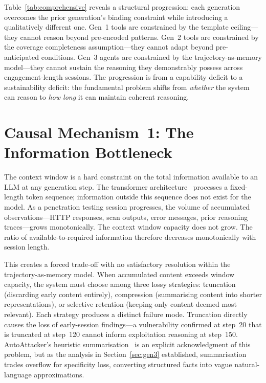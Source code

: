 \documentclass[12pt,a4paper,oneside,openany]{book}
\begin{document}
Table~\ref{tab:comprehensive} reveals a structural progression: each generation overcomes the prior generation's binding constraint while introducing a qualitatively different one. Gen~1 tools are constrained by the template ceiling---they cannot reason beyond pre-encoded patterns. Gen~2 tools are constrained by the coverage completeness assumption---they cannot adapt beyond pre-anticipated conditions. Gen~3 agents are constrained by the trajectory-as-memory model---they cannot sustain the reasoning they demonstrably possess across engagement-length sessions. The progression is from a capability deficit to a sustainability deficit: the fundamental problem shifts from \textit{whether} the system can reason to \textit{how long} it can maintain coherent reasoning.

\section{Causal Mechanism~1: The Information Bottleneck}

The context window is a hard constraint on the total information available to an LLM at any generation step. The transformer architecture~\citep{vaswani2017attention} processes a fixed-length token sequence; information outside this sequence does not exist for the model. As a penetration testing session progresses, the volume of accumulated observations---HTTP responses, scan outputs, error messages, prior reasoning traces---grows monotonically. The context window capacity does not grow. The ratio of available-to-required information therefore decreases monotonically with session length.

This creates a forced trade-off with no satisfactory resolution within the trajectory-as-memory model. When accumulated content exceeds window capacity, the system must choose among three lossy strategies: truncation (discarding early content entirely), compression (summarising content into shorter representations), or selective retention (keeping only content deemed most relevant). Each strategy produces a distinct failure mode. Truncation directly causes the loss of early-session findings---a vulnerability confirmed at step~20 that is truncated at step~120 cannot inform exploitation reasoning at step~150. AutoAttacker's heuristic summarisation~\citep{xu2024autoattacker} is an explicit acknowledgment of this problem, but as the analysis in Section~\ref{sec:gen3} established, summarisation trades overflow for specificity loss, converting structured facts into vague natural-language approximations.
\end{document}
